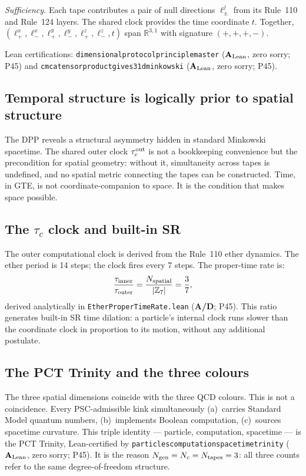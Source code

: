 \documentclass[11pt,openany]{book}
\theoremstyle{remark}
\newcommand{\ZS}{\mathbb{Z}_7}
\newcommand{\lean}[1]{%
  \penalty-100
  \begingroup\def\_{\textunderscore\allowbreak}\texttt{#1}\endgroup}
\newcommand{\CatAL}{\ensuremath{\textbf{A}_{\rm Lean}}}
\newcommand{\CatAD}{\textbf{A/D}}
\begin{document}
\noindent\textit{Sufficiency.} Each tape contributes a pair of null directions
$\ell_\pm^j$ from its Rule~110 and Rule~124 layers.
The shared clock provides the time coordinate $t$.
Together, $(\ell_+^x, \ell_-^x, \ell_+^y, \ell_-^y, \ell_+^z, \ell_-^z, t)$
span $\mathbb{R}^{3,1}$ with signature $(+,+,+,-)$.

Lean certifications:
\lean{dimensional\_protocol\_principle\_master} (\CatAL, zero sorry; P45)
and \lean{cmca\_tensor\_product\_gives\_31d\_minkowski} (\CatAL, zero sorry; P45).



\subsection*{Temporal structure is logically prior to spatial structure}

The DPP reveals a structural asymmetry hidden in standard Minkowski spacetime.
The shared outer clock $\tau_c^{\rm out}$ is not a bookkeeping convenience but the
precondition for spatial geometry: without it, simultaneity across tapes is undefined,
and no spatial metric connecting the tapes can be constructed.
Time, in GTE, is not coordinate-companion to space.
It is the condition that makes space possible.

\subsection*{The $\tau_c$ clock and built-in SR}

The outer computational clock is derived from the Rule~110 ether dynamics.
The ether period is 14 steps; the clock fires every 7 steps.
The proper-time rate is:
\begin{equation}
  \frac{\tau_{\rm inner}}{\tau_{\rm outer}} = \frac{N_{\rm spatial}}{|\ZS|} = \frac{3}{7},
  \label{eq:tau_ratio}
\end{equation}
derived analytically in \lean{EtherProperTimeRate.lean} (\CatAD; P45).
This ratio generates built-in SR time dilation: a particle's internal clock runs
slower than the coordinate clock in proportion to its motion, without any additional
postulate.

\subsection*{The PCT Trinity and the three colours}

The three spatial dimensions coincide with the three QCD colours.
This is not a coincidence.
Every PSC-admissible kink simultaneously (a)~carries Standard Model quantum numbers,
(b)~implements Boolean computation, (c)~sources spacetime curvature.
This triple identity --- particle, computation, spacetime --- is the PCT Trinity,
Lean-certified by \lean{particles\_computation\_spacetime\_trinity}
(\CatAL, zero sorry; P45).
It is the reason $N_{\rm gen} = N_c = N_{\rm tapes} = 3$: all three counts refer to
the same degree-of-freedom structure.
\end{document}
